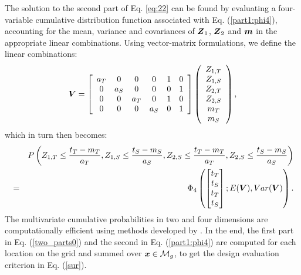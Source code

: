 \documentclass[aoas]{imsart}
\begin{document}
The solution to the second part of Eq. \eqref{eq:22} can be found by
evaluating a four-variable cumulative distribution function associated
with Eq. (\ref{part1:phi4}), accounting for the mean, variance and
covariances of ${\boldsymbol Z}_1$, ${\boldsymbol Z}_2$ and ${\boldsymbol m}$ in the appropriate linear
combinations. Using vector-matrix formulations, we define the linear
combinations:
\begin{equation}
\label{Vcomb}
    \bV=\left[
    \begin{array}{cccccc}
        a_T & 0 & 0 & 0 & 1 & 0 \\
         0 & a_S & 0 & 0 & 0 & 1 \\
         0 & 0 & a_T & 0 & 1 & 0\\
         0 & 0 & 0 & a_S & 0 & 1\\
    \end{array}
    \right] 
    \left(
    \begin{array}{cccccc}
         Z_{1,T} \\
         Z_{1,S} \\
         Z_{2,T} \\
         Z_{2,S} \\
         m_{T} \\
         m_{S}
    \end{array}
    \right),
\end{equation}
which in turn then becomes:
{\small
\begin{eqnarray}
\label{part1:phi4_2}
&&P \left( Z_{1,T} \leq \frac{t_T-m_{T}}{a_{T}}, 
Z_{1,S} \leq \frac{t_S-m_{S}}{a_{S}}, Z_{2,S} \leq \frac{t_T-m_{T}}{a_{T}}, Z_{2,S} \leq \frac{t_S-m_{S}}{a_{S}} \right)\\
&=&  \Phi_4 
\begin{pmatrix} 
\begin{bmatrix} t_T\\
t_S \\
t_T \\
t_S
\end{bmatrix};
E( \bV),Var(\bV)
\end{pmatrix} \nonumber.
\end{eqnarray}
}
The multivariate cumulative probabilities in two and four dimensions
are computationally efficient using methods developed by
\cite{genz2009computation}.  In the end, the first part in
Eq. (\ref{two_parts0}) and the second in Eq. (\ref{part1:phi4}) are
computed for each location on the grid and summed over
${\boldsymbol x} \in \mathcal{M}_g$, to get the design evaluation criterion in
Eq. (\ref{sur}).
\end{document}
